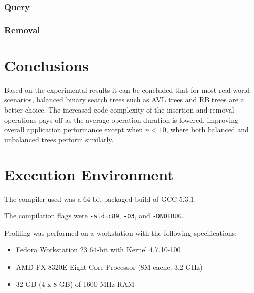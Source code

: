 \documentclass[12pt]{elsarticle}
\begin{document}






\subsubsection{Query}




% 

% 

\subsubsection{Removal}




% 

% 

\section{Conclusions}

Based on the experimental results it can be concluded that for most real-world
scenarios, balanced binary search trees such as AVL trees and RB trees are a
better choice. The increased code complexity of the insertion and removal
operations pays off as the average operation duration is lowered, improving
overall application performance except when \(n < 10\), where both balanced and
unbalanced trees perform similarly.

\appendix

\section{Execution Environment} \label{ap:ENV}

The compiler used was a 64-bit packaged build of GCC 5.3.1.

The compilation flags were \texttt{-std=c89}, \texttt{-O3}, and
\texttt{-DNDEBUG}.

Profiling was performed on a workstation with the following specifications:
\begin{itemize}
    \item Fedora Workstation 23 64-bit with Kernel 4.7.10-100
    \item AMD FX-8320E Eight-Core Processor (8M cache, 3.2 GHz)
    \item 32 GB (4 x 8 GB) of 1600 MHz RAM
\end{itemize}
\end{document}
